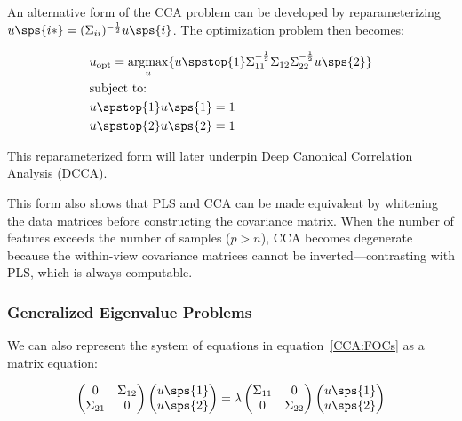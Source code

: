 An alternative form of the CCA problem can be developed by reparameterizing \(u\sps{i*}=(\Sigma_{ii})^{-\frac{1}{2}}u\sps{i}\). The optimization problem then becomes:

\begin{align}
     & u_{\text{opt}}=\underset{u}{\mathrm{argmax}}\{ u\spstop{1}\Sigma_{11}^{-\frac{1}{2}}\Sigma_{12}\Sigma_{22}^{-\frac{1}{2}}u\sps{2} \} \\
     & \text{subject to:} \notag \\
     & u\spstop{1}u\sps{1}=1 \notag \\
     & u\spstop{2}u\sps{2}=1 \notag
\end{align}

This reparameterized form will later underpin Deep Canonical Correlation Analysis (DCCA).

This form also shows that PLS and CCA can be made equivalent by whitening the data matrices before constructing the covariance matrix. When the number of features exceeds the number of samples (\(p>n\)), CCA becomes degenerate because the within-view covariance matrices cannot be inverted—contrasting with PLS, which is always computable.

\subsubsection{Generalized Eigenvalue Problems}

We can also represent the system of equations in equation~\ref{CCA:FOCs} as a matrix equation:

\begin{align}
    \begin{pmatrix}
        0 & \Sigma_{12} \\
        \Sigma_{21} & 0
    \end{pmatrix}
    \begin{pmatrix}
        u\sps{1} \\
        u\sps{2}
    \end{pmatrix}
    =
    \lambda
    \begin{pmatrix}
        \Sigma_{11} & 0 \\
        0                    & \Sigma_{22}
    \end{pmatrix}
    \begin{pmatrix}
        u\sps{1} \\
        u\sps{2}
    \end{pmatrix}
\end{align}

